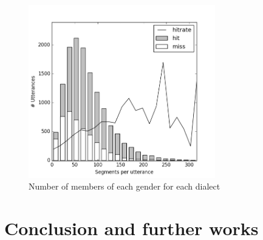 \documentclass[conference]{IEEEtran}
\begin{document}
\begin{figure}[!htb]
\centering
\includegraphics[width=3.2in]{hitrate}
\caption{Number of members of each gender for each dialect}
\label{demographics1}
\end{figure}

\section{Conclusion and further works}
\end{document}
